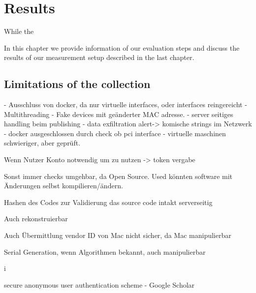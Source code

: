 \chapter{Results}
\label{chap:results}

While the 

In this chapter we provide information of our evaluation steps and discuss the results of our measurement setup described in the last chapter.\\

\section{Limitations of the collection}
\label{sec:measurement:robust}
%



- Ausschluss von docker, da nur virtuelle interfaces, oder interfaces reingereicht
- Multithreading
- Fake devices mit geänderter MAC adresse.
- server seitiges handling beim publishing
- data exfiltration alert-> komische strings im Netzwerk
- docker ausgeschlossen durch check ob pci interface
- virtuelle maschinen schwieriger, aber geprüft.


Wenn Nutzer Konto notwendig um zu nutzen -> token vergabe

Sonst immer checks umgehbar, da Open Source. Used könnten software mit Änderungen selbst kompilieren/ändern.

Hashen des Codes zur Validierung das source code intakt serverseitig

Auch rekonstruierbar

Auch Übermittlung vendor ID von Mac nicht sicher, da Mac manipulierbar

Serial Generation, wenn Algorithmen bekannt, auch manipulierbar

i%

secure anonymous user authentication scheme - Google Scholar


